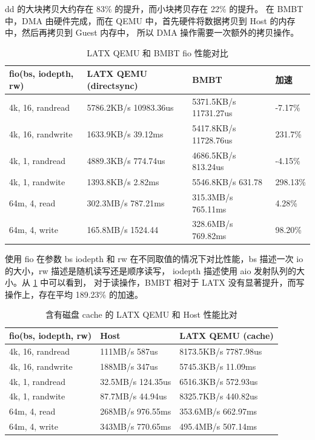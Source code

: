 dd 的大块拷贝大约存在 83\% 的提升，而小块拷贝存在 22\% 的提升。
在 BMBT 中，DMA 由硬件完成，而在 QEMU 中，首先硬件将数据拷贝到 Host 的内存中，然后再拷贝到 Guest 内存中，
所以 DMA 操作需要一次额外的拷贝操作。

\begin{table}[!ht]
	\centering
	\caption{LATX QEMU 和 BMBT fio 性能对比}
	\begin{tabular}{|l|l|l|l|}
		\hline
		fio(bs, iodepth, rw) & LATX QEMU (directsync) & BMBT                  & 加速     \\ \hline
		4k, 16, randread     & 5786.2KB/s 10983.36us  & 5371.5KB/s 11731.27us & -7.17\%  \\ \hline
		4k, 16, randwrite    & 1633.9KB/s 39.12ms     & 5417.8KB/s 11728.76us & 231.7\%  \\ \hline
		4k, 1, randread      & 4889.3KB/s 774.74us    & 4686.5KB/s 813.24us   & -4.15\%  \\ \hline
		4k, 1, randwite      & 1393.8KB/s 2.82ms      & 5546.8KB/s 631.78     & 298.13\% \\ \hline
		64m, 4, read         & 302.3MB/s 787.21ms     & 315.3MB/s 765.11ms    & 4.28\%   \\ \hline
		64m, 4, write        & 165.8MB/s 1524.44      & 328.6MB/s 769.82ms    & 98.20\%  \\ \hline
	\end{tabular}
	\label{fig:fio}
\end{table}

使用 fio 在参数 bs iodepth 和 rw 在不同取值的情况下对比性能，bs 描述一次 io 的大小，rw 描述是随机读写还是顺序读写，
iodepth 描述使用 aio 发射队列的大小。从 \ref{fig:fio} 中可以看到，
对于读操作，BMBT 相对于 LATX 没有显著提升，而写操作上，存在平均 189.23\% 的加速。

\begin{table}[!ht]
	\centering
	\caption{含有磁盘 cache 的 LATX QEMU 和 Host 性能比对}
	\begin{tabular}{|l|l|l|}
		\hline
		fio(bs, iodepth, rw) & Host              & LATX QEMU (cache)    \\ \hline
		4k, 16, randread     & 111MB/s 587us     & 8173.5KB/s 7787.98us \\ \hline
		4k, 16, randwrite    & 188MB/s 347us     & 5745.3KB/s 11.09ms   \\ \hline
		4k, 1, randread      & 32.5MB/s 124.35us & 6516.3KB/s 572.93us  \\ \hline
		4k, 1, randwite      & 87.7MB/s 44.94us  & 8325.7KB/s 440.82us  \\ \hline
		64m, 4, read         & 268MB/s 976.55ms  & 353.6MB/s 662.97ms   \\ \hline
		64m, 4, write        & 343MB/s 770.65ms  & 495.4MB/s 507.14ms   \\ \hline
	\end{tabular}
	\label{fig:fio_nocache}
\end{table}

